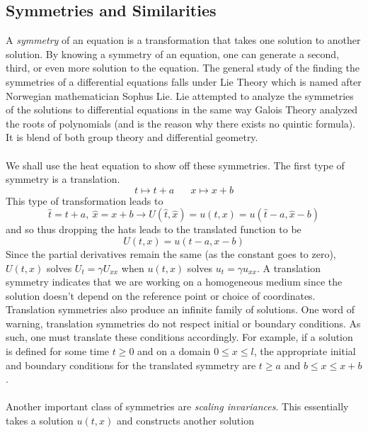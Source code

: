 \documentclass{article}
\numberwithin{equation}{section}
\begin{document}
\subsection{Symmetries and Similarities} 
A \textit{symmetry} of an equation is a transformation that takes one solution to another solution. By knowing a symmetry of an equation, one can generate a second, third, or even more solution to the equation. The general study of the finding the symmetries of a differential equations falls under Lie Theory which is named after Norwegian mathematician Sophus Lie. Lie attempted to analyze the symmetries of the solutions to differential equations in the same way Galois Theory analyzed the roots of polynomials (and is the reason why there exists no quintic formula). It is blend of both group theory and differential geometry.\\\\ We shall use the heat equation to show off these symmetries. The first type of symmetry is a translation.
\begin{equation}
    t \mapsto t+a \hspace{20pt} x\mapsto x+b
\end{equation}
This type of transformation leads to 
\begin{equation*}
    \hat{t} =t+a, \ \hat{x}=x+b \rightarrow U(\hat{t},\hat{x}) =u(t,x) =u(\hat{t}-a,\hat{x}-b)
\end{equation*}
and so thus dropping the hats leads to the translated function to be 
\begin{equation}
    U(t,x) = u(t-a,x-b) \label{eq:3.34}
\end{equation}
Since the partial derivatives remain the same (as the constant goes to zero), $U(t,x)$ solves $U_t=\gamma U_{xx}$ when $u(t,x)$ solves $u_t=\gamma u_{xx}$. A translation symmetry indicates that we are working on a homogeneous medium since the solution doesn't depend on the reference point or choice of coordinates. Translation symmetries also produce an infinite family of solutions. One word of warning, translation symmetries do not respect initial or boundary conditions. As such, one must translate these conditions accordingly. For example, if a solution is defined for some time $t\geq 0$ and on a domain $0\leq x\leq l$, the appropriate initial and boundary conditions for the translated symmetry are $t\geq a$ and $b\leq x \leq x+b$. \\\\
Another important class of symmetries are \textit{scaling invariances}. This essentially takes a solution $u(t,x)$ and constructs another solution 
\end{document}
